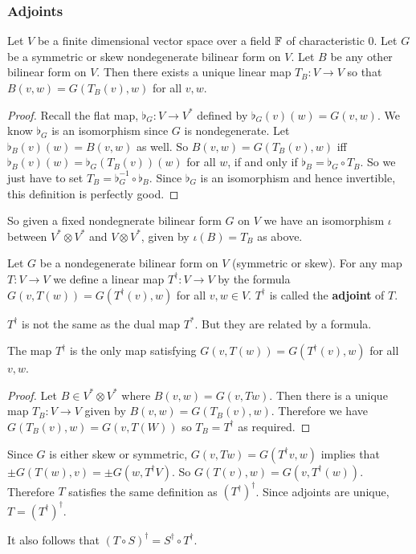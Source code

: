\subsubsection{Adjoints}
\begin{lemma}
Let $V$ be a finite dimensional vector space over a field $\operatorname{\mathbb{F}}$ of characteristic $0$. Let $G$ be a symmetric or skew nondegenerate bilinear form on $V$. Let $B$ be any other bilinear form on $V$. Then there exists a unique linear map $T_B : V\to V$ so that $B(v,w) = G(T_B(v),w)$ for all $v,w$.
\end{lemma}
\begin{proof}
    Recall the flat map, $\flat_G : V \to V^*$ defined by $\flat_G(v)(w) = G(v,w)$. We know $\flat_G$ is an isomorphism since $G$ is nondegenerate. Let $\flat_B(v)(w) = B(v,w)$ as well. So $B(v,w)=G(T_B(v),w)$ iff $\flat_B(v)(w)=\flat_G(T_B(v))(w)$ for all $w$, if and only if $\flat_B = \flat_G\circ T_B$. So we just have to set $T_B = \flat_G^{-1}\circ \flat_B$. Since $\flat_G$ is an isomorphism and hence invertible, this definition is perfectly good. 
\end{proof}
\begin{remark*}
    So given a fixed nondegnerate bilinear form $G$ on $V$ we have an isomorphism $\iota$ between $V^* \otimes V^*$ and $V\otimes V^*$, given by $\iota(B) = T_B$ as above. 
\end{remark*}
\begin{defn}[Adjoint] Let $G$ be a nondegenerate bilinear form on $V$ (symmetric or skew). For any map $T : V \to V$ we define a linear map $T^\dagger : V \to V$ by the formula $G(v,T(w)) = G(T^\dagger(v),w)$ for all $v,w\in V$. $T^\dagger$ is called the \textbf{adjoint} of $T$.
\end{defn}
\begin{remark*}
    $T^\dagger$ is not the same as the dual map $T^*$. But they are related by a formula.
\end{remark*}
\begin{lemma}
    The map $T^\dagger$ is the only map satisfying $G(v,T(w))=G(T^\dagger(v),w)$ for all $v,w$.
\end{lemma}
\begin{proof}
    Let $B \in V^*\otimes V^*$ where $B(v,w)=G(v,Tw)$. Then there is a unique map $T_B : V\to V$ given by $B(v,w) = G(T_B(v),w)$. Therefore we have $G(T_B(v),w)=G(v,T(W))$ so $T_B = T^\dagger$ as required.
\end{proof}
\begin{remark*}
    Since $G$ is either skew or symmetric, $
G(v,Tw) = G(T^\dagger v,w)$ implies that $\pm G(T(w),v) = \pm G(w,T^\dagger V)$. So $G(T(v),w) = G(v,T^\dagger(w))$. Therefore $T$ satisfies the same definition as $(T^\dagger)^\dagger$. Since adjoints are unique, $T = (T^\dagger)^\dagger$.

It also follows that $(T\circ S)^\dagger = S^\dagger\circ T^\dagger$.
\end{remark*}

